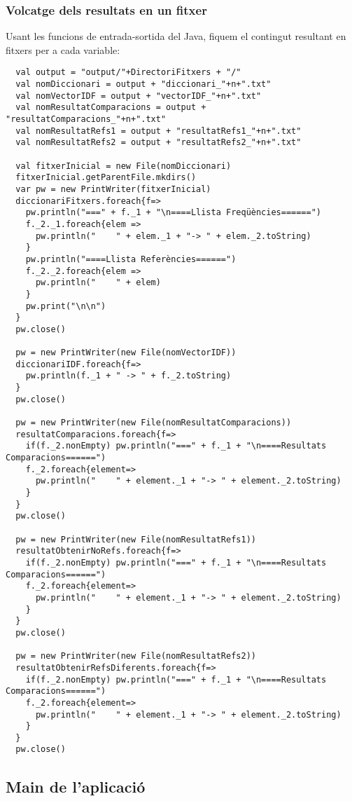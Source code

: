 \documentclass[11pt,a4paper,twoside]{report}
\begin{document}
\subsubsection{Volcatge dels resultats en un fitxer}

Usant les funcions de entrada-sortida del Java, fiquem el contingut resultant en fitxers per a cada variable:
\begin{lstlisting}
  val output = "output/"+DirectoriFitxers + "/"
  val nomDiccionari = output + "diccionari_"+n+".txt"
  val nomVectorIDF = output + "vectorIDF_"+n+".txt"
  val nomResultatComparacions = output + "resultatComparacions_"+n+".txt"
  val nomResultatRefs1 = output + "resultatRefs1_"+n+".txt"
  val nomResultatRefs2 = output + "resultatRefs2_"+n+".txt"

  val fitxerInicial = new File(nomDiccionari)
  fitxerInicial.getParentFile.mkdirs()
  var pw = new PrintWriter(fitxerInicial)
  diccionariFitxers.foreach{f=>
    pw.println("===" + f._1 + "\n====Llista Freqüències======")
    f._2._1.foreach{elem =>
      pw.println("    " + elem._1 + "-> " + elem._2.toString)
    }
    pw.println("====Llista Referències======")
    f._2._2.foreach{elem =>
      pw.println("    " + elem)
    }
    pw.print("\n\n")
  }
  pw.close()

  pw = new PrintWriter(new File(nomVectorIDF))
  diccionariIDF.foreach{f=>
    pw.println(f._1 + " -> " + f._2.toString)
  }
  pw.close()

  pw = new PrintWriter(new File(nomResultatComparacions))
  resultatComparacions.foreach{f=>
    if(f._2.nonEmpty) pw.println("===" + f._1 + "\n====Resultats Comparacions======")
    f._2.foreach{element=>
      pw.println("    " + element._1 + "-> " + element._2.toString)
    }
  }
  pw.close()

  pw = new PrintWriter(new File(nomResultatRefs1))
  resultatObtenirNoRefs.foreach{f=>
    if(f._2.nonEmpty) pw.println("===" + f._1 + "\n====Resultats Comparacions======")
    f._2.foreach{element=>
      pw.println("    " + element._1 + "-> " + element._2.toString)
    }
  }
  pw.close()

  pw = new PrintWriter(new File(nomResultatRefs2))
  resultatObtenirRefsDiferents.foreach{f=>
    if(f._2.nonEmpty) pw.println("===" + f._1 + "\n====Resultats Comparacions======")
    f._2.foreach{element=>
      pw.println("    " + element._1 + "-> " + element._2.toString)
    }
  }
  pw.close()
\end{lstlisting}

\subsection{Main de l'aplicació}
\end{document}
